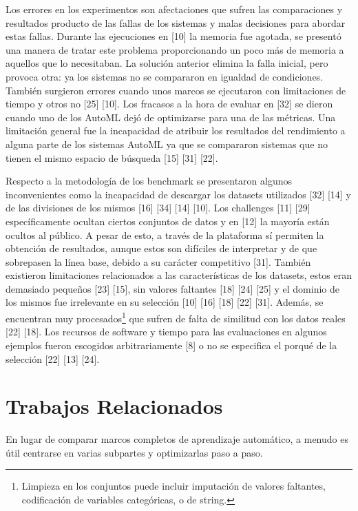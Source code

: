 Los errores en los experimentos son afectaciones que sufren las comparaciones y resultados producto de las fallas de los sistemas y malas decisiones para abordar estas 
fallas. Durante las ejecuciones en [10] la memoria fue agotada, se presentó una manera de tratar este problema proporcionando un poco más de memoria a aquellos que lo 
necesitaban. La solución anterior elimina la falla inicial, pero provoca otra: ya los sistemas no se compararon en igualdad de condiciones. También surgieron errores 
cuando unos marcos se ejecutaron con limitaciones de tiempo y otros no [25] [10]. Los fracasos a la hora de evaluar en [32] se dieron cuando uno de los AutoML dejó de 
optimizarse para una de las métricas. Una limitación general fue la incapacidad de atribuir los resultados del rendimiento a alguna parte de los sistemas AutoML ya que 
se compararon sistemas que no tienen el mismo espacio de búsqueda [15] [31] [22].

Respecto a la metodología de los benchmark se presentaron algunos inconvenientes como la incapacidad de descargar los datasets utilizados [32] [14] y de las divisiones de 
los mismos [16] [34] [14] [10]. Los challenges [11] [29] específicamente ocultan ciertos conjuntos de datos y en [12] la mayoría están ocultos al público. A pesar de 
esto, a través de la plataforma sí permiten la obtención de resultados, aunque estos son difíciles de interpretar y de que sobrepasen la línea base, debido a su 
carácter competitivo [31]. También existieron limitaciones relacionados a las características de los datasets, estos eran demasiado pequeños [23] [15], sin valores 
faltantes [18] [24] [25] y el dominio de los mismos fue irrelevante en su selección [10] [16] [18] [22] [31]. Además, se encuentran muy procesados\footnote{Limpieza en 
los conjuntos puede incluir imputación de valores faltantes, codificación de variables categóricas, o de string.} que sufren de falta de similitud con los datos reales 
[22] [18]. Los recursos de software y tiempo para las evaluaciones en algunos ejemplos fueron escogidos arbitrariamente [8] o no se especifica el porqué de la selección 
[22] [13] [24].  

\section{Trabajos Relacionados}\label{section:trabajos_relacionados}
En lugar de comparar marcos completos de aprendizaje automático, a menudo es útil centrarse en varias subpartes y optimizarlas paso a paso.

